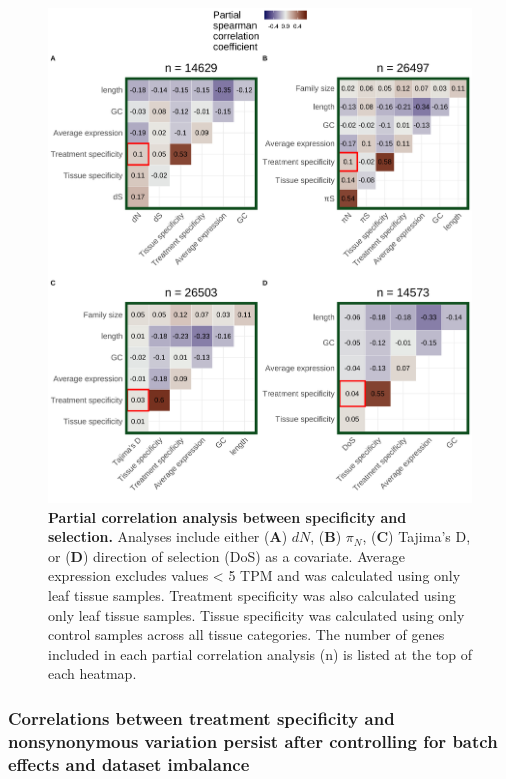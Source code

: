 \documentclass[12pt]{article}
\begin{document}
\begin{figure}[H]
\centering
\includegraphics[width=\linewidth, height = \textheight, keepaspectratio]{figures/chapter_1/partialCorrelations_withTissueSpecificity_leaf_2023-02-20.pdf}
\caption{\textbf{Partial correlation analysis between specificity and selection.} Analyses include either (\textbf{A}) $dN$, (\textbf{B}) $\pi_N$, (\textbf{C}) Tajima's D, or (\textbf{D}) direction of selection (DoS) as a covariate. Average expression excludes values < 5 TPM and was calculated using only leaf tissue samples. Treatment specificity was also calculated using only leaf tissue samples. Tissue specificity was calculated using only control samples across all tissue categories. The number of genes included in each partial correlation analysis (n) is listed at the top of each heatmap.}%
\label{fig:pcorImbalanced}
\end{figure}

\subsubsection*{Correlations between treatment specificity and nonsynonymous variation persist after controlling for batch effects and dataset imbalance}
\end{document}
